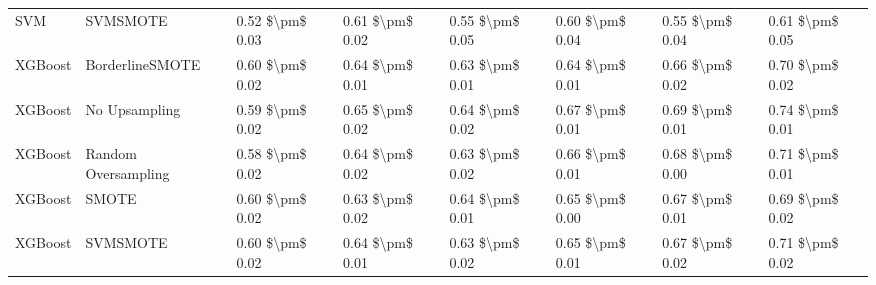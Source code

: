 \begin{tabular}{llllllll}
                            SVM &                      SVMSMOTE & 0.52 \$\textbackslash pm\$ 0.03 &           0.61 \$\textbackslash pm\$ 0.02 &       0.55 \$\textbackslash pm\$ 0.05 &        0.60 \$\textbackslash pm\$ 0.04 &                         0.55 \$\textbackslash pm\$ 0.04 & 0.61 \$\textbackslash pm\$ 0.05 \\
                        XGBoost &               BorderlineSMOTE & 0.60 \$\textbackslash pm\$ 0.02 &           0.64 \$\textbackslash pm\$ 0.01 &       0.63 \$\textbackslash pm\$ 0.01 &        0.64 \$\textbackslash pm\$ 0.01 &                         0.66 \$\textbackslash pm\$ 0.02 & 0.70 \$\textbackslash pm\$ 0.02 \\
                        XGBoost &                 No Upsampling & 0.59 \$\textbackslash pm\$ 0.02 &           0.65 \$\textbackslash pm\$ 0.02 &       0.64 \$\textbackslash pm\$ 0.02 &        0.67 \$\textbackslash pm\$ 0.01 &                         0.69 \$\textbackslash pm\$ 0.01 & 0.74 \$\textbackslash pm\$ 0.01 \\
                        XGBoost &           Random Oversampling & 0.58 \$\textbackslash pm\$ 0.02 &           0.64 \$\textbackslash pm\$ 0.02 &       0.63 \$\textbackslash pm\$ 0.02 &        0.66 \$\textbackslash pm\$ 0.01 &                         0.68 \$\textbackslash pm\$ 0.00 & 0.71 \$\textbackslash pm\$ 0.01 \\
                        XGBoost &                         SMOTE & 0.60 \$\textbackslash pm\$ 0.02 &           0.63 \$\textbackslash pm\$ 0.02 &       0.64 \$\textbackslash pm\$ 0.01 &        0.65 \$\textbackslash pm\$ 0.00 &                         0.67 \$\textbackslash pm\$ 0.01 & 0.69 \$\textbackslash pm\$ 0.02 \\
                        XGBoost &                      SVMSMOTE & 0.60 \$\textbackslash pm\$ 0.02 &           0.64 \$\textbackslash pm\$ 0.01 &       0.63 \$\textbackslash pm\$ 0.02 &        0.65 \$\textbackslash pm\$ 0.01 &                         0.67 \$\textbackslash pm\$ 0.02 & 0.71 \$\textbackslash pm\$ 0.02 \\
\bottomrule
\end{tabular}
